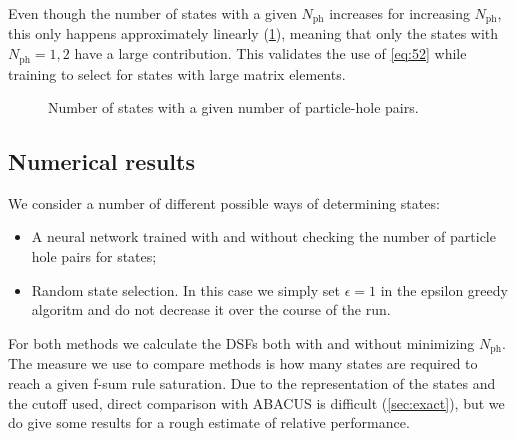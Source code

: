 \documentclass[11pt, a4paper]{report} %
\begin{document}
Even though the number of states with a given \(N_{\mathrm{ph}}\) increases for increasing \(N_{\mathrm{ph}}\), this only happens approximately linearly (\cref{fig:numberofstatesph}), meaning that only the states with \(N_{\mathrm{ph}}=1,2\) have a large contribution.
This validates the use of \cref{eq:52} while training to select for states with large matrix elements.
\begin{figure}[tb!]
  \centering
  \caption{Number of states with a given number of particle-hole pairs.}
  \label{fig:numberofstatesph}
\end{figure}




\subsection{Numerical results}


We consider a number of different possible ways of determining states:
\begin{itemize}
\item A neural network trained with and without checking the number of particle hole pairs for states;
\item Random state selection. In this case we simply set \(\epsilon=1\) in the epsilon greedy algoritm and do not decrease it over the course of the run.
\end{itemize}
For both methods we calculate the DSFs both with and without minimizing \(N_{\mathrm{ph}}\).
The measure we use to compare methods is how many states are required to reach a given f-sum rule saturation.
Due to the representation of the states and the cutoff used, direct comparison with ABACUS is difficult (\cref{sec:exact}), but we do give some results for a rough estimate of relative performance.
\end{document}
